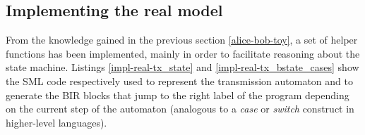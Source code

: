 \documentclass{kththesis}
\begin{document}
{%

\subsection{Implementing the real model} \label{impl-real-model}

From the knowledge gained in the previous section \ref{alice-bob-toy}, a set of helper functions has been implemented, mainly in order to facilitate reasoning about the state machine. Listings \ref{impl-real-tx_state} and \ref{impl-real-tx_bstate_cases} show the SML code respectively used to represent the transmission automaton and to generate the BIR blocks that jump to the right label of the program depending on the current step of the automaton (analogous to a \textit{case} or \textit{switch} construct in higher-level languages).

}
\end{document}
